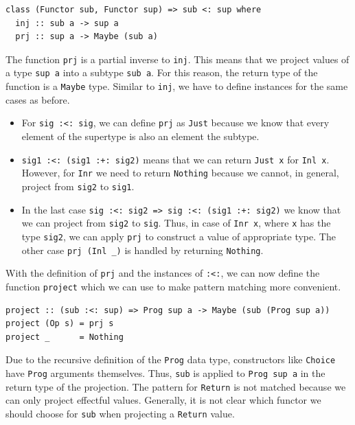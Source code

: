 \documentclass[a4paper, 11pt, fleqn, twoside, abstract=on]{scrreprt}
\newcommand{\hinl}[1]{\texttt{#1}}
\newcommand{\cinl}[1]{\texttt{#1}}
\begin{document}
\begin{verbatim}
class (Functor sub, Functor sup) => sub <: sup where
  inj :: sub a -> sup a
  prj :: sup a -> Maybe (sub a)
\end{verbatim}

The function \hinl{prj} is a partial inverse to \hinl{inj}.
This means that we project values of a type \hinl{sup a} into a subtype \hinl{sub a}.
For this reason, the return type of the function is a \hinl{Maybe} type.
Similar to \hinl{inj}, we have to define instances for the same cases as before.

\begin{itemize}
\item For \hinl{sig :<: sig}, we can define \hinl{prj} as \hinl{Just} because we know that every element of the supertype is also an element the subtype.

\item \hinl{sig1 :<: (sig1 :+: sig2)} means that we can return \hinl{Just x} for \hinl{Inl x}.
However, for \hinl{Inr} we need to return \hinl{Nothing} because we cannot, in general, project from \hinl{sig2} to \hinl{sig1}.

\item In the last case \hinl{sig :<: sig2 => sig :<: (sig1 :+: sig2)} we know that we can project from \hinl{sig2} to \hinl{sig}.
Thus, in case of \hinl{Inr x}, where \hinl{x} has the type \hinl{sig2}, we can apply \hinl{prj} to construct a value of appropriate type.
The other case \hinl{prj (Inl _)} is handled by returning \hinl{Nothing}.
\end{itemize}

With the definition of \hinl{prj} and the instances of \hinl{:<:}, we can now define the function \hinl{project} which we can use to make pattern matching more convenient.

\begin{verbatim}
project :: (sub :<: sup) => Prog sup a -> Maybe (sub (Prog sup a))
project (Op s) = prj s
project _      = Nothing
\end{verbatim}

Due to the recursive definition of the \hinl{Prog} data type, constructors like \hinl{Choice} have \hinl{Prog} arguments themselves.
Thus, \hinl{sub} is applied to \hinl{Prog sup a} in the return type of the projection.
The pattern for \cinl{Return} is not matched because we can only project effectful values.
Generally, it is not clear which functor we should choose for \hinl{sub} when projecting a \hinl{Return} value.
\end{document}
